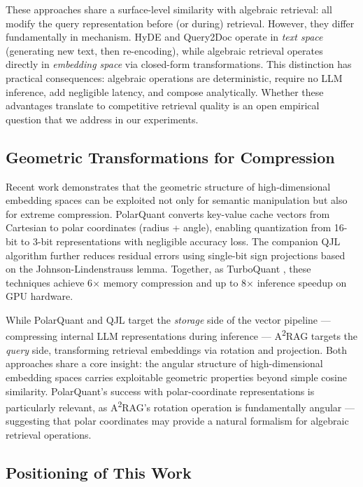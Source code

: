 \documentclass{article}
\begin{document}
These approaches share a surface-level similarity with algebraic retrieval: all modify the query representation before (or during) retrieval. However, they differ fundamentally in mechanism. HyDE and Query2Doc operate in \emph{text space} (generating new text, then re-encoding), while algebraic retrieval operates directly in \emph{embedding space} via closed-form transformations. This distinction has practical consequences: algebraic operations are deterministic, require no LLM inference, add negligible latency, and compose analytically. Whether these advantages translate to competitive retrieval quality is an open empirical question that we address in our experiments.

\subsection{Geometric Transformations for Compression}

Recent work demonstrates that the geometric structure of high-dimensional embedding spaces can be exploited not only for semantic manipulation but also for extreme compression. PolarQuant \cite{polarquant2026} converts key-value cache vectors from Cartesian to polar coordinates (radius + angle), enabling quantization from 16-bit to 3-bit representations with negligible accuracy loss. The companion QJL algorithm \cite{qjl2026} further reduces residual errors using single-bit sign projections based on the Johnson-Lindenstrauss lemma. Together, as TurboQuant \cite{turboquant2026}, these techniques achieve 6$\times$ memory compression and up to 8$\times$ inference speedup on GPU hardware.

While PolarQuant and QJL target the \emph{storage} side of the vector pipeline --- compressing internal LLM representations during inference --- A\textsuperscript{2}RAG targets the \emph{query} side, transforming retrieval embeddings via rotation and projection. Both approaches share a core insight: the angular structure of high-dimensional embedding spaces carries exploitable geometric properties beyond simple cosine similarity. PolarQuant's success with polar-coordinate representations is particularly relevant, as A\textsuperscript{2}RAG's rotation operation is fundamentally angular --- suggesting that polar coordinates may provide a natural formalism for algebraic retrieval operations.

\subsection{Positioning of This Work}
\end{document}
